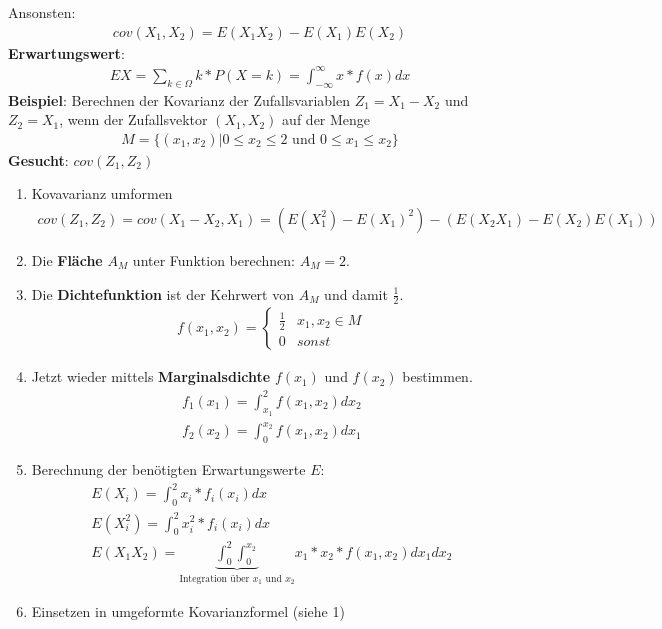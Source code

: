 \documentclass{article}
\begin{document}
Ansonsten:
\begin{align}
	cov(X_1,X_2) = E(X_1X_2) - E(X_1)E(X_2)
\end{align}
\textbf{Erwartungswert}:
\begin{align}
	EX = \sum_{k \in \Omega} k * P(X = k) = \int_{-\infty}^{\infty} x * f(x) dx
\end{align}
\textbf{Beispiel}:
Berechnen der Kovarianz der Zufallsvariablen $Z_1 = X_1 - X_2$ und $Z_2 = X_1$,
wenn der Zufallsvektor $(X_1,X_2)$ auf der Menge
\begin{align}
	M = \{(x_1,x_2)| 0 \leq x_2 \leq 2 \text{ und } 0 \leq x_1 \leq x_2\}
\end{align}
\textbf{Gesucht}: $cov(Z_1, Z_2)$
\begin{enumerate}
	\item Kovavarianz umformen
		\begin{align}
			cov(Z_1, Z_2) = cov(X_1-X_2, X_1) = (E(X^2_1)-E(X_1)^2)-(E(X_2X_1)-E(X_2)E(X_1))
		\end{align}
	\item Die \textbf{Fl\"ache} $A_M$ unter Funktion berechnen: $A_M = 2$.\\
	\item Die \textbf{Dichtefunktion} ist der Kehrwert von $A_M$ und damit $\frac{1}{2}$.
		\begin{align}
			f(x_1,x_2) =
			\begin{cases}
				\frac{1}{2} & x_1,x_2 \in M \\
				0 & sonst
			\end{cases}
		\end{align}
	\item Jetzt wieder mittels \textbf{Marginalsdichte} $f(x_1)$ und $f(x_2)$ bestimmen.
		\begin{align}
			f_1(x_1) = \int_{x_1}^2 f(x_1,x_2) dx_2\\
			f_2(x_2) = \int_{0}^{x_2} f(x_1,x_2) dx_1
		\end{align}
	\item Berechnung der ben\"otigten Erwartungswerte $E$:
		\begin{align}
			E(X_i) = \int_{0}^{2} x_i * f_i(x_i) dx\\
			E(X_i^2) = \int_{0}^{2} x_i^2 * f_i(x_i) dx\\
			E(X_1X_2) = \underbrace{\int_0^{2}\int_{0}^{x_2}}_{\text{Integration \"uber $x_1$ und
			$x_2$}} x_1*x_2*f(x_1,x_2) dx_1 dx_2
		\end{align}
	\item Einsetzen in umgeformte Kovarianzformel (siehe 1)
\end{enumerate}
\end{document}
